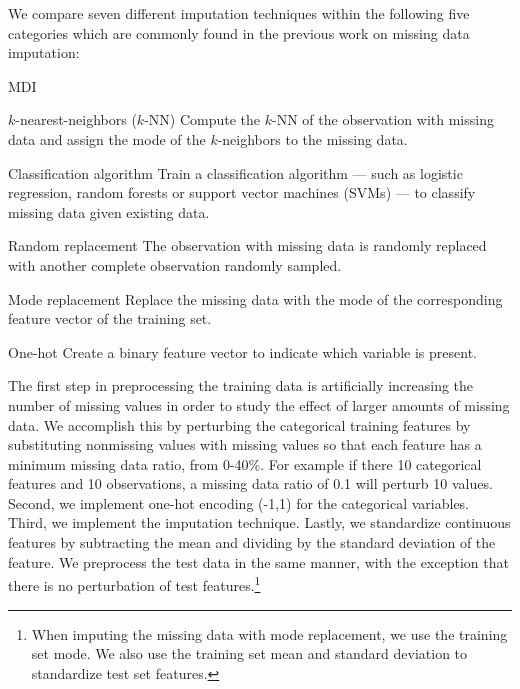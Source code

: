 \documentclass[10pt]{book}
\theoremstyle{definition}
\begin{document}
\par
{}

We compare seven different imputation techniques within the following five categories which are commonly found in the previous work on missing data imputation:

\begin{labeling}{MDI}

\item[$k$-nearest-neighbors ($k$-NN)]
Compute the $k$-NN of the observation with missing data and assign the mode of the $k$-neighbors to the missing data.

\item[Classification algorithm]
Train a classification algorithm --- such as logistic regression, random forests or support vector machines (SVMs) --- to classify missing data given existing data. 


\item[Random replacement] 
    The observation with missing data is randomly replaced with another complete observation randomly sampled.

\item[Mode replacement]
Replace the missing data with the mode of the corresponding feature vector of the training set.

\item[One-hot] Create a binary feature vector to indicate which variable is present.

\end{labeling}

\par
{}

The first step in preprocessing the training data is artificially increasing the number of missing values in order to study the effect of larger amounts of missing data. We accomplish this by perturbing the categorical training features by substituting nonmissing values with missing values so that each feature has a minimum missing data ratio, from 0-40\%. For example if there 10 categorical features and 10 observations, a missing data ratio of 0.1 will perturb 10 values. Second, we implement one-hot encoding (-1,1) for the categorical variables. Third, we implement the imputation technique. Lastly, we standardize continuous features by subtracting the mean and dividing by the standard deviation of the feature. We preprocess the test data in the same manner, with the exception that there is no perturbation of test features.\footnote{When imputing the missing data with mode replacement, we use the training set mode. We also use the training set mean and standard deviation to standardize test set features.}
\end{document}

